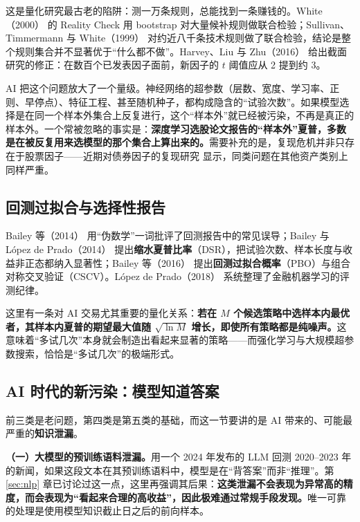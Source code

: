 这是量化研究最古老的陷阱：测一万条规则，总能找到一条赚钱的。White（2000）\cite{white2000} 的 Reality Check 用 bootstrap 对大量候补规则做联合检验；Sullivan、Timmermann 与 White（1999）\cite{sullivan1999} 对约近八千条技术规则做了联合检验，结论是整个规则集合并不显著优于“什么都不做”。Harvey、Liu 与 Zhu（2016）\cite{harveylz2016} 给出截面研究的修正：在数百个已发表因子面前，新因子的 $t$ 阈值应从 2 提到约 3。

AI 把这个问题放大了一个量级。神经网络的超参数（层数、宽度、学习率、正则、早停点）、特征工程、甚至随机种子，都构成隐含的“试验次数”。如果模型选择是在同一个样本外集合上反复进行，这个“样本外”就已经被污染，不再是真正的样本外。一个常被忽略的事实是：\textbf{深度学习选股论文报告的“样本外”夏普，多数是在被反复用来选模型的那个集合上算出来的。}需要补充的是，复现危机并非只存在于股票因子——近期对债券因子的复现研究\cite{bondreplication2026} 显示，同类问题在其他资产类别上同样严重。

\subsection{回测过拟合与选择性报告}

Bailey 等（2014）\cite{bailey2014pseudo} 用“伪数学”一词批评了回测报告中的常见误导；Bailey 与 L\'opez de Prado（2014）\cite{bailey2014dsr} 提出\textbf{缩水夏普比率}（DSR），把试验次数、样本长度与收益非正态都纳入显著性；Bailey 等（2016）\cite{bailey2016pbo} 提出\textbf{回测过拟合概率}（PBO）与组合对称交叉验证（CSCV）。L\'opez de Prado（2018）\cite{lopezdeprado2018} 系统整理了金融机器学习的评测纪律。

这里有一条对 AI 交易尤其重要的量化关系：\textbf{若在 $M$ 个候选策略中选样本内最优者，其样本内夏普的期望最大值随 $\sqrt{\ln M}$ 增长，即使所有策略都是纯噪声。}这意味着“多试几次”本身就会制造出看起来显著的策略——而强化学习与大规模超参数搜索，恰恰是“多试几次”的极端形式。

\subsection{AI 时代的新污染：模型知道答案}

前三类是老问题，第四类是第五类的基础，而这一节要讲的是 AI 带来的、可能最严重的\textbf{知识泄漏}。

\textbf{（一）大模型的预训练语料泄漏。}用一个 2024 年发布的 LLM 回测 2020--2023 年的新闻，如果这段文本在其预训练语料中，模型是在“背答案”而非“推理”。第 \ref{sec:nlp} 章已讨论过这一点，这里再强调其后果：\textbf{这类泄漏不会表现为异常高的精度，而会表现为“看起来合理的高收益”，因此极难通过常规手段发现。}唯一可靠的处理是使用模型知识截止日之后的前向样本。

